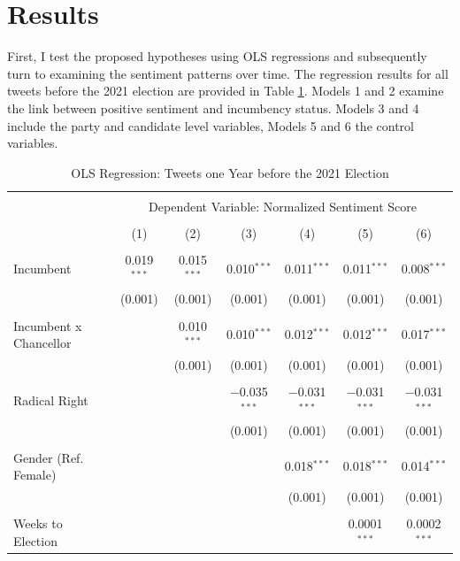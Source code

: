 \documentclass[a4paper,11pt]{article}
\begin{document}
\hypertarget{results}{%
\section{Results}\label{results}}

First, I test the proposed hypotheses using OLS regressions and subsequently turn to examining the sentiment patterns over time. The regression results for all tweets before the 2021 election are provided in Table \ref{tab:regone}. Models 1 and 2 examine the link between positive sentiment and incumbency status. Models 3 and 4 include the party and candidate level variables, Models 5 and 6 the control variables.
\newpage
\begin{table}[H]
    \centering
    \caption{OLS Regression: Tweets one Year before the 2021 Election}
    \label{tab:regone}
\begingroup 
\scriptsize 
\begin{tabular}{@{\extracolsep{5pt}}lcccccc} 
\\[-1.8ex]\hline 
\hline \\[-1.8ex] 
 & \multicolumn{6}{c}{Dependent Variable: Normalized Sentiment Score} \\ 
\cline{2-7} 
\\[-1.8ex] & (1) & (2) & (3) & (4) & (5) & (6)\\ 
\hline \\[-1.8ex] 
 Incumbent & 0.019$^{***}$ & 0.015$^{***}$ & 0.010$^{***}$ & 0.011$^{***}$ & 0.011$^{***}$ & 0.008$^{***}$ \\ 
  & (0.001) & (0.001) & (0.001) & (0.001) & (0.001) & (0.001) \\ 
  & & & & & & \\ 
 Incumbent x Chancellor &  & 0.010$^{***}$ & 0.010$^{***}$ & 0.012$^{***}$ & 0.012$^{***}$ & 0.017$^{***}$ \\ 
  &  & (0.001) & (0.001) & (0.001) & (0.001) & (0.001) \\ 
  & & & & & & \\ 
 Radical Right &  &  & $-$0.035$^{***}$ & $-$0.031$^{***}$ & $-$0.031$^{***}$ & $-$0.031$^{***}$ \\ 
  &  &  & (0.001) & (0.001) & (0.001) & (0.001) \\ 
  & & & & & & \\ 
 Gender (Ref. Female) &  &  &  & 0.018$^{***}$ & 0.018$^{***}$ & 0.014$^{***}$ \\ 
  &  &  &  & (0.001) & (0.001) & (0.001) \\ 
  & & & & & & \\ 
 Weeks to Election &  &  &  &  & 0.0001$^{***}$ & 0.0002$^{***}$ \\ 

\end{tabular}
\end{table}
\end{document}
